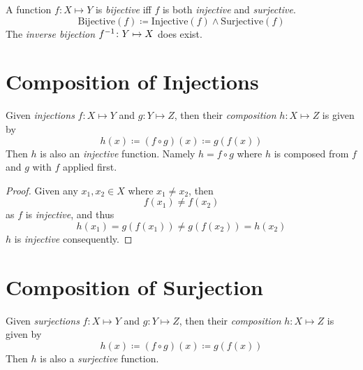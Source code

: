 \begin{definition}[Bijection]
    A function $f \colon X \mapsto Y$ is \textit{bijective} iff $f$ is both \textit{injective} and \textit{surjective}.
    \begin{equation}
        \mathrm{Bijective}(f) \coloneqq \mathrm{Injective}(f) \land \mathrm{Surjective}(f)
    \end{equation}
    The \textit{inverse bijection} ${f}^{-1} \colon Y \mapsto X$ does exist.
\end{definition}

\section{Composition of Injections}
\begin{proposition}
    Given \textit{injections} $f \colon X \mapsto Y$ and $g \colon Y \mapsto Z$, then their \textit{composition} $h \colon X \mapsto Z$ is given by
    \begin{equation}
        h(x) \coloneqq (f \circ g)(x) \coloneqq g(f(x))
    \end{equation}
    Then $h$ is also an \textit{injective} function. Namely $h = f \circ g$ where $h$ is composed from $f$ and $g$ with $f$ applied first.
\end{proposition}

\begin{proof}
    Given any $x_1, x_2 \in X$ where $x_1 \neq x_2$, then
    \begin{equation}
        f(x_1) \ne f(x_2)
    \end{equation}
    as $f$ is \textit{injective}, and thus
    \begin{equation}
        h(x_1) = g(f(x_1)) \neq g(f(x_2)) = h(x_2)
    \end{equation}
    $h$ is \textit{injective} consequently.
\end{proof}

\section{Composition of Surjection}
\begin{proposition}
    Given \textit{surjections} $f \colon X \mapsto Y$ and $g \colon Y \mapsto Z$, then their \textit{composition} $h \colon X \mapsto Z$ is given by
    \begin{equation}
        h(x) \coloneqq (f \circ g)(x) \coloneqq g(f(x))
    \end{equation}
    Then $h$ is also a \textit{surjective} function.
\end{proposition}

